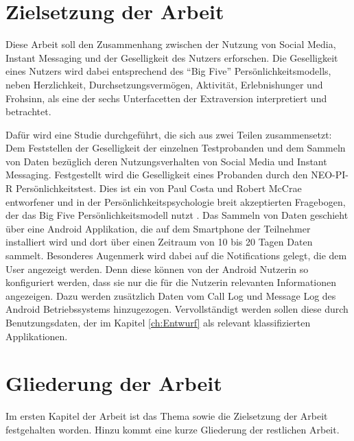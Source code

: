 \section{Zielsetzung der Arbeit}
\label{ch:Einleitung:sec:Zielsetzung}

Diese Arbeit soll den Zusammenhang zwischen der Nutzung von Social Media, Instant Messaging und der Geselligkeit des Nutzers erforschen.
Die Geselligkeit eines Nutzers wird dabei entsprechend des "`Big Five"' Persönlichkeitsmodells, neben Herzlichkeit, Durchsetzungsvermögen, Aktivität, Erlebnishunger und Frohsinn, als eine der sechs Unterfacetten der Extraversion interpretiert und betrachtet\cite{john1999big}.


Dafür wird eine Studie durchgeführt, die sich aus zwei Teilen zusammensetzt:
Dem Feststellen der Geselligkeit der einzelnen Testprobanden und dem Sammeln von Daten bezüglich deren Nutzungsverhalten von Social Media und Instant Messaging. 
Festgestellt wird die Geselligkeit eines Probanden durch den NEO-PI-R Persönlichkeitstest.
Dies ist ein von Paul Costa und Robert McCrae entworfener und in der Persönlichkeitspsychologie breit akzeptierten Fragebogen, der das Big Five Persönlichkeitsmodell nutzt \cite{costa1992neo2}.
Das Sammeln von Daten geschieht über eine Android Applikation, die auf dem Smartphone der Teilnehmer installiert wird und dort über einen Zeitraum von 10 bis 20 Tagen Daten sammelt.
Besonderes Augenmerk wird dabei auf die Notifications gelegt, die dem User angezeigt werden.
Denn diese können von der Android Nutzerin so konfiguriert werden, dass sie nur die für die Nutzerin relevanten Informationen angezeigen.
Dazu werden zusätzlich Daten vom Call Log und Message Log des Android Betriebssystems hinzugezogen.
Vervollständigt werden sollen diese durch Benutzungsdaten, der im Kapitel \ref{ch:Entwurf} als relevant klassifizierten Applikationen.


\section{Gliederung der Arbeit}
\label{ch:Einleitung:sec:Gliederung}

Im ersten Kapitel der Arbeit ist das Thema sowie die Zielsetzung der Arbeit festgehalten worden.
Hinzu kommt eine kurze Gliederung der restlichen Arbeit.
\par

